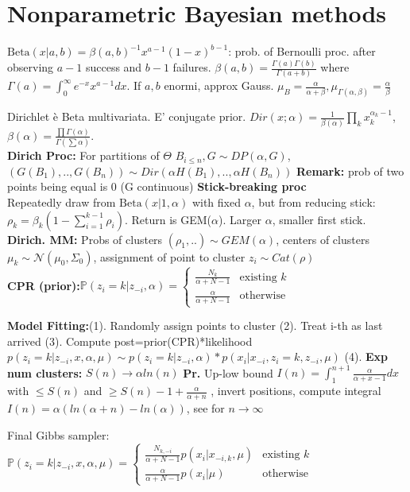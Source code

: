 \section*{Nonparametric Bayesian methods}
$\text{Beta}(x|a,b)=\beta(a,b)^{-1} x^{a-1}(1-x)^{b-1}$: prob. of Bernoulli proc. after observing $a-1$ success and $b-1$ failures. $\beta(a,b)=\frac{\Gamma(a)\Gamma(b)}{\Gamma(a+b)}$ where $\Gamma(a)=\int_0^\infty e^{-x}x^{a-1}dx$. If $a,b$ enormi, approx Gauss.
$\mu_{B}=\frac\alpha{\alpha+\beta}, \mu_{\Gamma(\alpha, \beta)}=\frac\alpha\beta$

Dirichlet è Beta multivariata. E' conjugate prior. $Dir(x;\alpha)\mathrm{=}\frac{1}{\beta(\alpha)}\prod_k x_k^{\alpha_k-1}$, $\beta(\alpha)\mathrm{=}\frac{\prod\Gamma(\alpha)}{\Gamma(\sum\alpha)}$.\\
\textbf{Dirich Proc:} For partitions of $\Theta$ $B_{i\le n}, G\sim DP(\alpha,G)$, $(G(B_1),..,G(B_n))\sim Dir(\alpha H(B_1),..,\alpha H(B_n))$ \textbf{Remark:} prob of two points being equal is 0 (G continuous)
\textbf{Stick-breaking proc} \\ Repeatedly draw from $\text{Beta}(x|1,\alpha)$ with fixed $\alpha$, but from reducing stick: $\rho_k=\beta_k(1-\sum_{i=1}^{k-1}\rho_i)$. Return is GEM($\alpha$). Larger $\alpha$, smaller first stick.\\
\textbf{Dirich. MM:} Probs of clusters $(\rho_1,..)\sim GEM(\alpha)$, centers of clusters $\mu_k\sim\mathcal N(\mu_0,\Sigma_0)$, assignment of point to cluster $z_i\sim Cat(\rho)$\\
\textbf{CPR (prior):}$\mathbb{P}(z_i=k|z_{-i},\alpha)=\begin{cases}\frac{N_k}{\alpha+N-1} & \text{existing }k \\ \frac{\alpha}{\alpha+N-1} & \text{otherwise}\end{cases}$

\textbf{Model Fitting:}(1). Randomly assign points to cluster (2). Treat i-th as last arrived (3). Compute post=prior(CPR)*likelihood $p(z_i=k|z_{-i},x,\alpha,\mu)\sim p(z_i=k|z_{-i},\alpha)*p(x_i|x_{-i},z_i=k,z_{-i},\mu)$ (4).
\textbf{Exp num clusters:} $S(n)\to \alpha ln(n)$ \textbf{Pr.} Up-low bound $I(n)=\int_1^{n+1}\frac{\alpha}{\alpha+x-1}dx$ with $\le S(n)$ and $\ge S(n)-1+\frac{\alpha}{\alpha + n}$ , invert positions, compute integral $I(n)=\alpha(ln(\alpha+n)-ln(\alpha))$, see for $n\to\infty$

Final Gibbs sampler:\\
$\mathbb{P}(z_i=k|z_{-i}, x,\alpha,\mu)=\begin{cases}\frac{N_{k,-i}}{\alpha+N-1}p(x_i|x_{-i,k},\mu) & \text{existing }k \\ \frac{\alpha}{\alpha+N-1}p(x_i|\mu) & \text{otherwise}\end{cases}$

